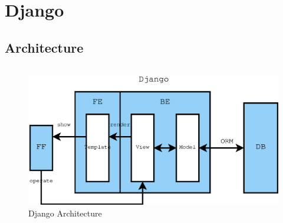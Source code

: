 \documentclass{beamer}
\begin{document}
\section{Django} %

\subsection{Architecture}
\begin{frame}
  \begin{columns}[c] %

    \begin{figure}
      \centering
      \includegraphics[width=1.10\linewidth]{django_arch}
      \caption{Django Architecture}
    \end{figure}


\end{columns}
\end{frame}
\end{document}
